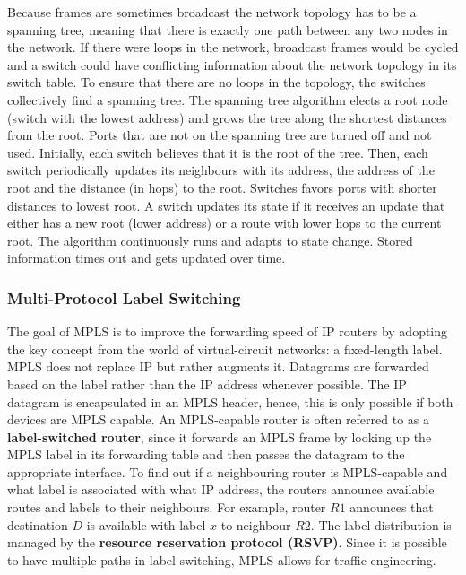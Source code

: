 Because frames are sometimes broadcast the network topology has to be a spanning tree, meaning that there is exactly one path between any two nodes in the network. If there were loops in the network, broadcast frames would be cycled and a switch could have conflicting information about the network topology in its switch table. To ensure that there are no loops in the topology, the switches collectively find a spanning tree. The spanning tree algorithm elects a root node (switch with the lowest address) and grows the tree along the shortest distances from the root. Ports that are not on the spanning tree are turned off and not used. Initially, each switch believes that it is the root of the tree. Then, each switch periodically updates its neighbours with its address, the address of the root and the distance (in hops) to the root. Switches favors ports with shorter distances to lowest root. A switch updates its state if it receives an update that either has a new root (lower address) or a route with lower hops to the current root. The algorithm continuously runs and adapts to state change. Stored information times out and gets updated over time.

\subsubsection{Multi-Protocol Label Switching}
The goal of MPLS is to improve the forwarding speed of IP routers by adopting the key concept from the world of virtual-circuit networks: a fixed-length label. MPLS does not replace IP but rather augments it. Datagrams are forwarded based on the label rather than the IP address whenever possible. The IP datagram is encapsulated in an MPLS header, hence, this is only possible if both devices are MPLS capable. An MPLS-capable router is often referred to as a \textbf{label-switched router}, since it forwards an MPLS frame by looking up the MPLS label in its forwarding table and then passes the datagram to the appropriate interface. To find out if a neighbouring router is MPLS-capable and what label is associated with what IP address, the routers announce available routes and labels to their neighbours. For example, router $R1$ announces that destination $D$ is available with label $x$ to neighbour $R2$. The label distribution is managed by the \textbf{resource reservation protocol (RSVP)}. Since it is possible to have multiple paths in label switching, MPLS allows for traffic engineering.

